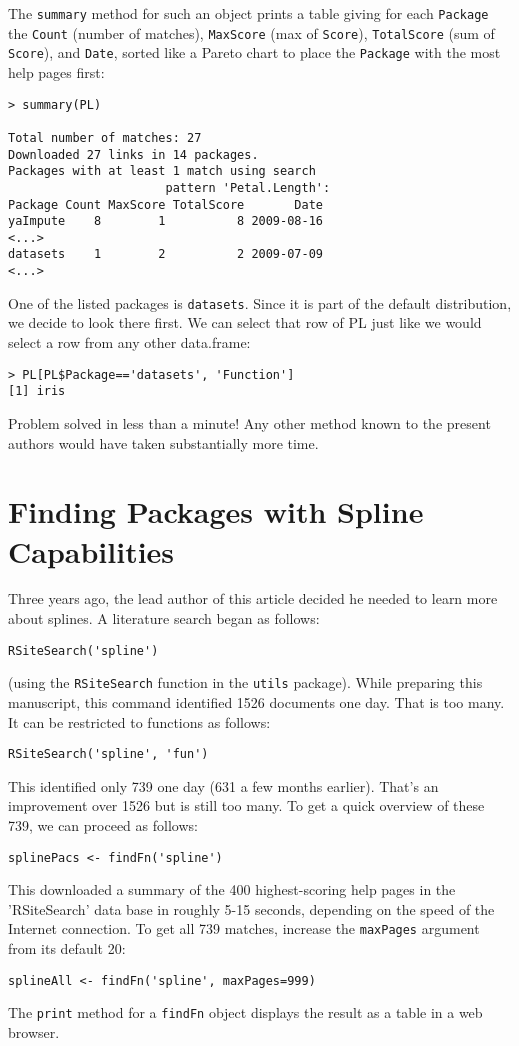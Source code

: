 The {\tt summary} method for such an object prints a table giving
for each {\tt Package} the {\tt Count} (number of matches),
{\tt MaxScore} (max of {\tt Score}), {\tt TotalScore} (sum of
{\tt Score}), and {\tt Date}, sorted like a Pareto chart to place
the {\tt Package} with the most help pages first:
\begin{verbatim}
> summary(PL)

Total number of matches: 27
Downloaded 27 links in 14 packages.
Packages with at least 1 match using search
                      pattern 'Petal.Length':
Package Count MaxScore TotalScore       Date
yaImpute    8        1          8 2009-08-16
<...>
datasets    1        2          2 2009-07-09
<...>
\end{verbatim}
One of the listed packages is {\tt datasets}.  Since it is part of the
default \R{} distribution, we decide to look there first.  We can
select that row of PL just like we would select a row from any other
data.frame:
\begin{verbatim}
> PL[PL$Package=='datasets', 'Function']
[1] iris
\end{verbatim}
Problem solved in less than a minute!  Any other method known
to the present authors would have taken substantially more time.

\section*{Finding Packages with Spline Capabilities}

Three years ago, the lead author of this article decided he
needed to learn more about splines.  A literature search
began as follows:
\begin{verbatim}
RSiteSearch('spline')
\end{verbatim}
(using the {\tt RSiteSearch} function in the {\tt utils} package).
While preparing this manuscript, this command identified
1526 documents one day.  That is too many.  It can be
restricted to functions as follows:
\begin{verbatim}
RSiteSearch('spline', 'fun')
\end{verbatim}
This identified only 739 one day (631 a few months earlier).
That's an improvement over 1526 but is still too many.
To get a quick overview of these 739, we can proceed
as follows:
\begin{verbatim}
splinePacs <- findFn('spline')
\end{verbatim}
This downloaded a summary of the 400 highest-scoring help pages
in the 'RSiteSearch' data base in roughly 5-15 seconds, depending
on the speed of the Internet connection.  To get all 739 matches,
increase the {\tt maxPages} argument from its default 20:
\begin{verbatim}
splineAll <- findFn('spline', maxPages=999)
\end{verbatim}
The {\tt print} method for a {\tt findFn} object displays the
result as a table in a web browser.

